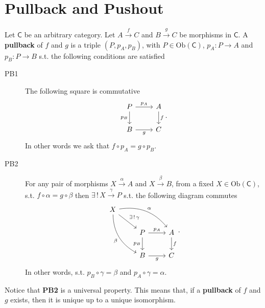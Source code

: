 \section{Pullback and Pushout}
\begin{defn}[Pullback]
	Let $\mathsf{C}$ be an arbitrary category.
	Let $A \xrightarrow{f} C$ and $B \xrightarrow{g} C$ be morphisms in $\mathsf{C}$.
	A \textbf{pullback} of $f$ and $g$ is a triple $\left(P, p_A, p_B\right)$, with $P \in \mathrm{Ob} \left(\mathsf{C}\right)$, $p_A: P \to A$ and $p_B: P \to B$ s.t. the following conditions are satisfied
	\begin{description}
		\item[PB1] The following square is commutative
			\begin{equation}
			\begin{tikzcd}
				P \arrow[r, "p_A", rightarrow] \arrow[d, "p_B"', rightarrow] & A \arrow[d, "f", rightarrow] \\
				B \arrow[r, "g"', rightarrow] & C
			\end{tikzcd}
			.\end{equation} 
			In other words we ask that $f \circ p_A = g \circ p_B$.
		\item[PB2] For any pair of morphisms $X \xrightarrow{\alpha} A$ and $X \xrightarrow{\beta} B$, from a fixed $X \in \mathrm{Ob} \left(\mathsf{C}\right)$, s.t. $f \circ \alpha = g \circ \beta$ then $\exists\, !\, X \xrightarrow{\gamma} P$ s.t. the following diagram commutes
			\begin{equation}
			\begin{tikzcd}
				X \arrow[rd, "\exists\, !\, \gamma", rightarrow] \arrow[rrd, "\alpha", rightarrow, bend left] \arrow[rdd, "\beta"', rightarrow, bend right] &  & \\
			   & P \arrow[r, "p_A", rightarrow] \arrow[d, "p_B"', rightarrow] & A \arrow[d, "f", rightarrow] \\
			   & B \arrow[r, "g"', rightarrow] & C
			\end{tikzcd}
			.\end{equation} 
			In other words, s.t. $p_B \circ \gamma = \beta$ and $p_A \circ \gamma = \alpha$.
	\end{description} 
\end{defn}
		
\begin{rem}
	Notice that \textbf{PB2} is a universal property.
	This means that, if a \textbf{pullback} of $f$ and $g$ exists, then it is unique up to a unique isomorphism.
\end{rem}

